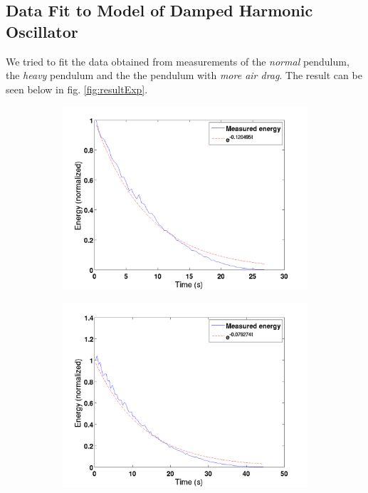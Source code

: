 

\subsection{Data Fit to Model of Damped Harmonic Oscillator}\label{sec:harmonic}
We tried to fit the data obtained from measurements of the \emph{normal} pendulum, the \emph{heavy} pendulum and the the pendulum with \emph{more air drag}. The result can be seen below in fig. \ref{fig:resultExp}.
\begin{figure}[htbp]
\centering
\begin{subfigure}{.45\textwidth}
	\centering
	\includegraphics[width=\textwidth]{img/resultExpNormal}
	\caption{}
	\label{fig:resultExpNormal}
\end{subfigure}
\begin{subfigure}{.45\textwidth}
	\centering
	\includegraphics[width=\textwidth]{img/resultExpHeavy}

\end{subfigure}
\end{figure}
